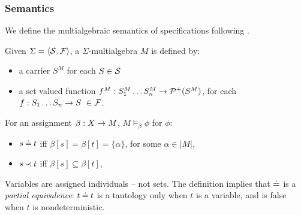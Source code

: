 \subsubsection{Semantics}
We define the multialgebraic semantics of specifications following \cite{adt}.
\begin{DEFINITION}
Given $\Sigma=\langle{\cal S},{\cal F}\rangle$, a $\Sigma$-multialgebra $M$ is defined by:
\begin{itemize}\MyLPar
\item a carrier $S^M$ for each $S\in{\cal S}$ \item a set valued function $f^M:S_1^M\ldots S_n^M\rightarrow {\cal P}^+(S^M)$, for each $f:S_1\ldots S_n\rightarrow S\ \in{\cal F}$. \end{itemize}
For an assignment $\beta:X\rightarrow M$, $M\models_\beta\phi$ for $\phi$: \begin{itemize}\MyLPar
\item $s\mathbin{\doteq} t$ iff $\beta[s]=\beta[t]=\{\alpha\}$, for some $\alpha\in |M|$, \item $s\mathbin{\prec} t$ iff $\beta[s]\subseteq\beta[t]$, \end{itemize}
\end{DEFINITION}
\noindent Variables are assigned individuals -- not sets. The definition implies
that
$\mathbin{\doteq}$ is a {\em partial equivalence}: $t\mathbin{\doteq} t$ is a tautology only when $t$ is a variable, and is false when $t$ is nondeterministic. 

